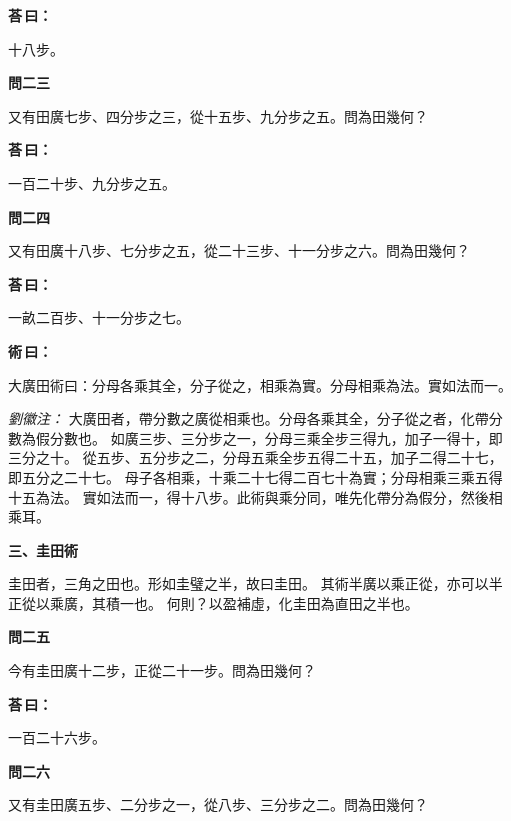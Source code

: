 \documentclass[11pt,a4paper]{article}
\newenvironment{problem}[1][]{%
  \par\vspace{0.6em}\noindent\textcolor{problemcolor}{\textbf{問\ignorespaces#1\unskip}\hspace{0.5em}}%
  \ignorespaces
}{\par\vspace{0.4em}}
\newenvironment{answer}{%
  \par\noindent\textcolor{answercolor}{\textbf{荅\,曰：}}%
  \ignorespaces
}{\par\vspace{0.3em}}
\newenvironment{method}{%
  \par\noindent\textcolor{methodcolor}{\textbf{術\,曰：}}%
  \ignorespaces
}{\par\vspace{0.4em}}
\newenvironment{liuhuicomm}{%
  \par\vspace{0.3em}\noindent\textcolor{commentarycolor}{\small\textit{劉徽注：}}}%
  {\par\vspace{0.5em}}
\begin{document}
\begin{answer}
十八步。
\end{answer}

\begin{problem}[二三]
又有田廣七步、四分步之三，從十五步、九分步之五。問為田幾何？
\end{problem}

\begin{answer}
一百二十步、九分步之五。
\end{answer}

\begin{problem}[二四]
又有田廣十八步、七分步之五，從二十三步、十一分步之六。問為田幾何？
\end{problem}

\begin{answer}
一畝二百步、十一分步之七。
\end{answer}

\begin{method}
大廣田術曰：分母各乘其全，分子從之，相乘為實。分母相乘為法。實如法而一。
\end{method}

\begin{liuhuicomm}
大廣田者，帶分數之廣從相乘也。分母各乘其全，分子從之者，化帶分數為假分數也。
如廣三步、三分步之一，分母三乘全步三得九，加子一得十，即三分之十。
從五步、五分步之二，分母五乘全步五得二十五，加子二得二十七，即五分之二十七。
母子各相乘，十乘二十七得二百七十為實；分母相乘三乘五得十五為法。
實如法而一，得十八步。此術與乘分同，唯先化帶分為假分，然後相乘耳。
\end{liuhuicomm}

\vspace{0.8em}
\noindent\textbf{\large 三、圭田術}
\vspace{0.5em}

\noindent 圭田者，三角之田也。形如圭璧之半，故曰圭田。
其術半廣以乘正從，亦可以半正從以乘廣，其積一也。
何則？以盈補虛，化圭田為直田之半也。

\begin{problem}[二五]
今有圭田廣十二步，正從二十一步。問為田幾何？
\end{problem}

\begin{answer}
一百二十六步。
\end{answer}

\begin{problem}[二六]
又有圭田廣五步、二分步之一，從八步、三分步之二。問為田幾何？
\end{problem}
\end{document}
